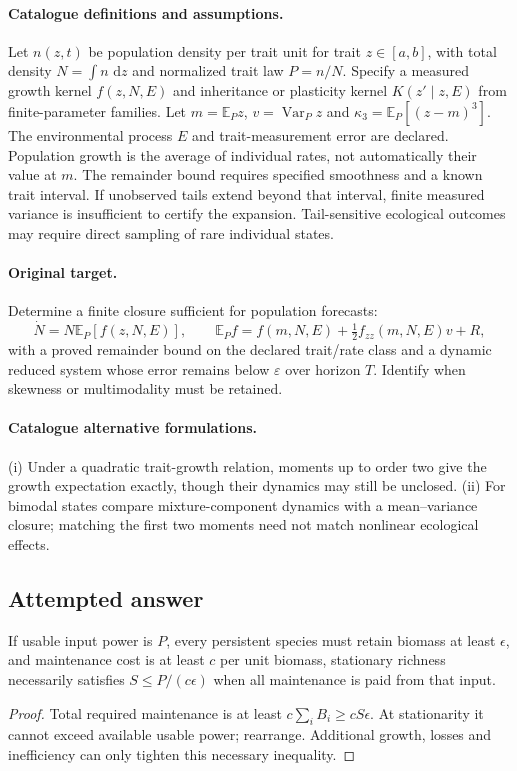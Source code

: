 \documentclass[11pt]{article}
\begin{document}
\paragraph{Catalogue definitions and assumptions.}
Let $n(z,t)$ be population density per trait unit for trait $z\in[a,b]$, with total density $N=\int n\,\,\mathrm{d} z$ and normalized trait law $P=n/N$. Specify a measured growth kernel $f(z,N,E)$ and inheritance or plasticity kernel $K(z'\mid z,E)$ from finite-parameter families. Let $m=\mathbb{E}_Pz$, $v=\operatorname{Var}_Pz$ and $\kappa_3=\mathbb{E}_P[(z-m)^3]$. The environmental process $E$ and trait-measurement error are declared. Population growth is the average of individual rates, not automatically their value at $m$. The remainder bound requires specified smoothness and a known trait interval. If unobserved tails extend beyond that interval, finite measured variance is insufficient to certify the expansion. Tail-sensitive ecological outcomes may require direct sampling of rare individual states.
\paragraph{Original target.}
Determine a finite closure sufficient for population forecasts:
\[
 \dot N=N\mathbb{E}_P[f(z,N,E)],\qquad
 \mathbb{E}_Pf=f(m,N,E)+\tfrac12f_{zz}(m,N,E)v+R,
\]
with a proved remainder bound on the declared trait/rate class and a dynamic reduced system whose error remains below $\varepsilon$ over horizon $T$. Identify when skewness or multimodality must be retained.
\paragraph{Catalogue alternative formulations.}
(i) Under a quadratic trait-growth relation, moments up to order two give the growth expectation exactly, though their dynamics may still be unclosed. (ii) For bimodal states compare mixture-component dynamics with a mean--variance closure; matching the first two moments need not match nonlinear ecological effects.
\subsection{Attempted answer}
\begin{proposition}
If usable input power is $P$, every persistent species must retain biomass at least $\epsilon$, and maintenance cost is at least $c$ per unit biomass, stationary richness necessarily satisfies $S\leq P/(c\epsilon)$ when all maintenance is paid from that input.
\end{proposition}
\begin{proof}
Total required maintenance is at least $c\sum_iB_i\geq cS\epsilon$. At stationarity it cannot exceed available usable power; rearrange. Additional growth, losses and inefficiency can only tighten this necessary inequality.
\end{proof}
\end{document}
